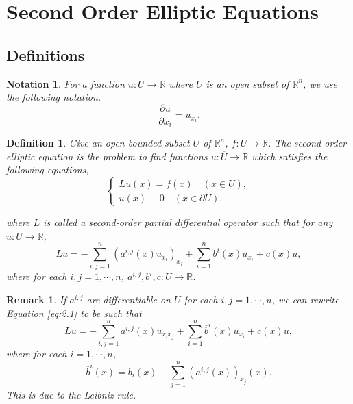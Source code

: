 \documentclass{article}
\newtheorem{definition}{Definition}[section]
\newtheorem{notation}{Notation}[section]
\newtheorem{remark}{Remark}[section]
\numberwithin{equation}{section}
\begin{document}
\section{Second Order Elliptic Equations}

\subsection{Definitions}

\begin{notation}
For a function $u:U\to\mathbb{R}$ where $U$ is an open subset of $\mathbb{R}^n$, we use the following notation.
\begin{equation*}
{\frac {\partial u} {\partial x_i}} = u_{x_i}.
\end{equation*}
\end{notation}

\begin{definition}
Give an open bounded subset $U$ of $\mathbb{R}^n$, $f:U\to\mathbb{R}$. The second order elliptic equation is the problem to find functions $u:\overline{U}\to\mathbb{R}$ which satisfies the following equations,
\begin{equation*}
\begin{cases}
Lu(x)=f(x)\quad (x\in U),\\
u(x)\equiv 0 \quad(x\in\partial U),
\end{cases}
\end{equation*}

where $L$ is called a second-order partial differential operator such that for any $u:U\to\mathbb{R}$, 
\begin{equation}
\label{eq:2.1}
Lu = -\sum_{i,j=1}^n (a^{i,j}(x)u_{x_i})_{x_j}+\sum_{i=1}^nb^i(x)u_{x_i}+c(x)u,
\end{equation}
where for each $i,j=1,\cdots,n$, $a^{i,j},b^i,c:U\to\mathbb{R}$. 
\end{definition}

\begin{remark}
If $a^{i,j}$ are differentiable on $U$ for each $i,j=1,\cdots,n$, we can rewrite Equation \ref{eq:2.1} to be such that
\begin{equation}
\label{eq:2.2}
Lu = -\sum_{i,j=1}^n a^{i,j}(x)u_{x_ix_j}+\sum_{i=1}^n\overline{b}^i(x)u_{x_i}+c(x)u,
\end{equation}
where for each $i=1,\cdots,n$,
\begin{equation*}
\overline{b}^i(x) = b_i(x)-\sum_{j=1}^n (a^{i,j}(x))_{x_j}(x).
\end{equation*}
This is due to the Leibniz rule.
\end{remark}
\end{document}
